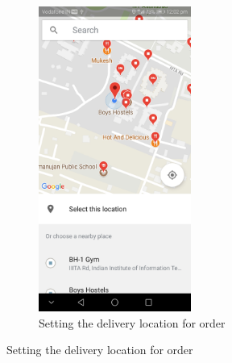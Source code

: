 \documentclass{report}
\begin{document}
\begin{figure}[h!]
\begin{subfigure}[h!]{.3\textwidth}
\includegraphics[width=5cm]{place_picker.jpg}
\caption{\centering Setting the delivery location for order}
\end{subfigure}


\end{figure}
\end{document}
